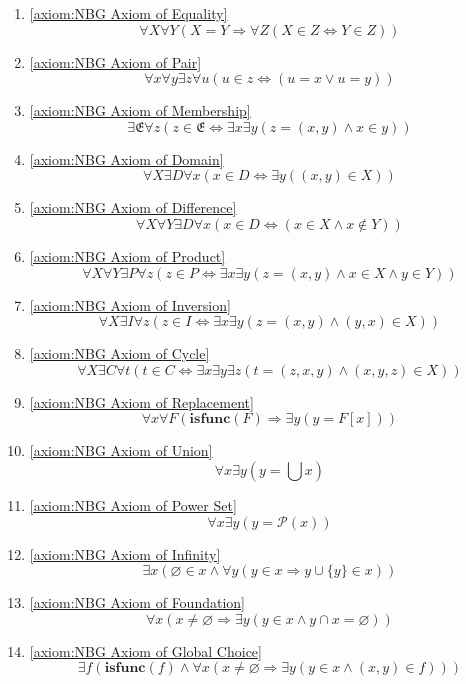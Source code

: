 \begin{enumerate}
    \item \ref{axiom:NBG Axiom of Equality}
    \[
        \forall X \forall Y (X = Y \Rightarrow \forall Z (X \in Z \Leftrightarrow Y \in Z))
    \]
    \item \ref{axiom:NBG Axiom of Pair}
    \[
        \forall x \forall y \exists z \forall u (u \in z \Leftrightarrow (u = x \lor u = y))
    \]
    \item \ref{axiom:NBG Axiom of Membership}
    \[
        \exists \mathfrak{E} \forall z (z \in \mathfrak{E} \Leftrightarrow \exists x \exists y (z = (x,y) \land x \in y))
    \]
    \item \ref{axiom:NBG Axiom of Domain}
    \[
        \forall X \exists D \forall x (x \in D \Leftrightarrow \exists y ((x,y) \in X))
    \]
    \item \ref{axiom:NBG Axiom of Difference}
    \[
        \forall X \forall Y \exists D \forall x (x \in D \Leftrightarrow (x \in X \land x \notin Y))
    \]
    \item \ref{axiom:NBG Axiom of Product}
    \[
        \forall X \forall Y \exists P \forall z (z \in P \Leftrightarrow \exists x \exists y (z = (x,y) \land x \in X \land y \in Y))
    \]
    \item \ref{axiom:NBG Axiom of Inversion}
    \[
        \forall X \exists I \forall z (z \in I \Leftrightarrow \exists x \exists y (z = (x,y) \land (y,x) \in X))
    \]
    \item \ref{axiom:NBG Axiom of Cycle}
    \[
        \forall X \exists C \forall t (t \in C \Leftrightarrow \exists x \exists y \exists z (t = (z,x,y) \land (x,y,z) \in X))
    \]
    \item \ref{axiom:NBG Axiom of Replacement}
    \[
        \forall x \forall F (\mathbf{isfunc} (F) \Rightarrow \exists y (y = F[x]))
    \]
    \item \ref{axiom:NBG Axiom of Union}
    \[
        \forall x \exists y (y = \bigcup x)
    \]
    \item \ref{axiom:NBG Axiom of Power Set}
    \[
        \forall x \exists y (y = \mathcal{P} (x))
    \]
    \item \ref{axiom:NBG Axiom of Infinity}
    \[
        \exists x (\varnothing \in x \land \forall y (y \in x \Rightarrow y \cup \{y\} \in x))
    \]
    \item \ref{axiom:NBG Axiom of Foundation}
    \[
        \forall x (x \neq \varnothing \Rightarrow \exists y (y \in x \land y \cap x = \varnothing))
    \]
    \item \ref{axiom:NBG Axiom of Global Choice}
    \[
        \exists f (\mathbf{isfunc} (f) \land \forall x (x \neq \varnothing \Rightarrow \exists y (y \in x \land (x,y) \in f)))
    \]
\end{enumerate}

